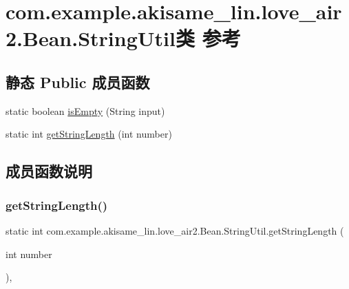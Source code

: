 \hypertarget{classcom_1_1example_1_1akisame__lin_1_1love__air2_1_1_bean_1_1_string_util}{}\section{com.\+example.\+akisame\+\_\+lin.\+love\+\_\+air2.\+Bean.\+String\+Util类 参考}
\label{classcom_1_1example_1_1akisame__lin_1_1love__air2_1_1_bean_1_1_string_util}
\subsection*{静态 Public 成员函数}
\begin{DoxyCompactItemize}
\item 
static boolean \mbox{\hyperlink{classcom_1_1example_1_1akisame__lin_1_1love__air2_1_1_bean_1_1_string_util_a3e9141022773ff6999f281e02319497e}{is\+Empty}} (String input)
\item 
static int \mbox{\hyperlink{classcom_1_1example_1_1akisame__lin_1_1love__air2_1_1_bean_1_1_string_util_afcab661f21f5942dbec9c1f00e75f844}{get\+String\+Length}} (int number)
\end{DoxyCompactItemize}


\subsection{成员函数说明}
\mbox{\label{classcom_1_1example_1_1akisame__lin_1_1love__air2_1_1_bean_1_1_string_util_afcab661f21f5942dbec9c1f00e75f844}} 
\subsubsection{\texorpdfstring{getStringLength()}{getStringLength()}}
{\footnotesize\ttfamily static int com.\+example.\+akisame\+\_\+lin.\+love\+\_\+air2.\+Bean.\+String\+Util.\+get\+String\+Length (\begin{DoxyParamCaption}\item[{int}]{number }\end{DoxyParamCaption})\hspace{0.3cm}{\ttfamily [inline]}, {\ttfamily [static]}}

